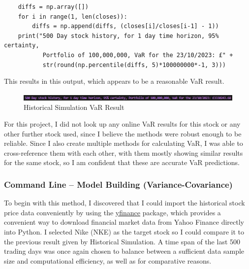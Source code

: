 \documentclass{article}
\begin{document}
  \begin{verbatim}
    diffs = np.array([])
    for i in range(1, len(closes)): 
        diffs = np.append(diffs, (closes[i]/closes[i-1] - 1))
    print("500 Day stock history, for 1 day time horizon, 95% certainty, 
           Portfolio of 100,000,000, VaR for the 23/10/2023: £" + 
           str(round(np.percentile(diffs, 5)*100000000*-1, 3)))
    \end{verbatim}

This results in this output, which appears to be a reasonable VaR result. \\\vspace{0.3cm}

  \begin{figure}[h]
    \centering
    \includegraphics[width=1\textwidth]{Images/Historical Command Line Result.png}
    \caption{Historical Simulation VaR Result}
    \label{fig:Historical Command Line Result}
  \end{figure}

For this project, I did not look up any online VaR results for this stock or any other further stock used, since I believe the methods were robust enough to be reliable. Since I also create multiple methods for calculating VaR, I was able to cross-reference them with each other, with them mostly showing similar results for the same stock, so I am confident that 
these are accurate VaR predictions.

\subsubsection{Command Line -- Model Building  (Variance-Covariance)}\label{Command Model}

To begin with this method, I discovered that I could import the historical stock price data conveniently by using the \href{https://pypi.org/project/yfinance/}{yfinance} package, which provides a convenient way to download financial market data from Yahoo Finance directly into Python. I selected Nike (NKE) as the target stock so I could compare it to the previous result given by Historical Simulation. A time span of the last 500 trading days was once again chosen to balance between a sufficient data sample size and computational efficiency, as well as for comparative reasons.\\\vspace{0.3cm}
\end{document}

